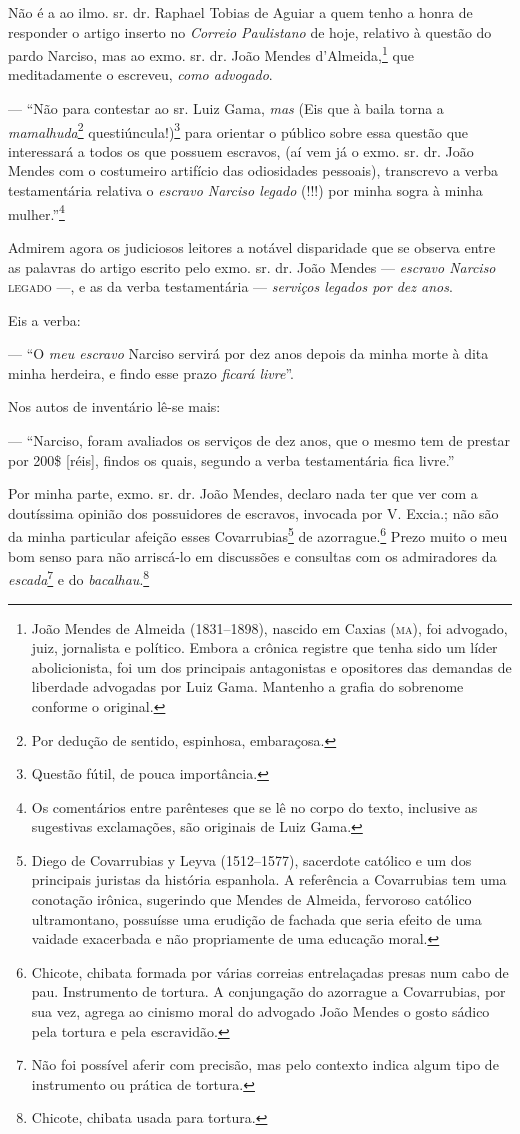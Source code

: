 Não é a ao ilmo. sr. dr. Raphael Tobias de Aguiar a quem tenho a honra
de responder o artigo inserto no \emph{Correio Paulistano} de hoje,
relativo à questão do pardo Narciso, mas ao exmo. sr. dr. João Mendes
d'Almeida,\footnote{ João Mendes de Almeida (1831--1898), nascido em
  Caxias (\textsc{ma}), foi advogado, juiz, jornalista e político. Embora a
  crônica registre que tenha sido um líder abolicionista, foi um dos
  principais antagonistas e opositores das demandas de liberdade
  advogadas por Luiz Gama. Mantenho a grafia do sobrenome conforme o
  original.} que meditadamente o escreveu, \emph{como advogado}.

--- ``Não para contestar ao sr. Luiz Gama, \emph{mas} (Eis que à baila
torna a \emph{mamalhuda}\footnote{ Por dedução de sentido,
  espinhosa, embaraçosa.} questiúncula!)\footnote{ Questão fútil, de
  pouca importância.} para orientar o público sobre essa questão que
interessará a todos os que possuem escravos, (aí vem já o exmo. sr. dr.
João Mendes com o costumeiro artifício das odiosidades pessoais),
transcrevo a verba testamentária relativa o \emph{escravo Narciso
legado} (!!!) por minha sogra à minha mulher.''\footnote{ Os
  comentários entre parênteses que se lê no corpo do texto, inclusive as
  sugestivas exclamações, são originais de Luiz Gama.}

Admirem agora os judiciosos leitores a notável disparidade que se
observa entre as palavras do artigo escrito pelo exmo. sr. dr. João
Mendes --- \emph{escravo Narciso} \textsc{legado} ---, e as da verba
testamentária --- \emph{serviços legados por dez anos}.

Eis a verba:

--- ``O \emph{meu escravo} Narciso servirá por dez anos depois da minha
morte à dita minha herdeira, e findo esse prazo \emph{ficará livre}''.

Nos autos de inventário lê-se mais:

--- ``Narciso, foram avaliados os serviços de dez anos, que o mesmo tem
de prestar por 200\$ {[}réis{]}, findos os quais, segundo a verba
testamentária fica livre.''

Por minha parte, exmo. sr. dr. João Mendes, declaro nada ter que ver com
a doutíssima opinião dos possuidores de escravos, invocada por V.
Excia.; não são da minha particular afeição esses Covarrubias\footnote{
  Diego de Covarrubias y Leyva (1512--1577), sacerdote católico e um dos
  principais juristas da história espanhola. A referência a Covarrubias
  tem uma conotação irônica, sugerindo que Mendes de Almeida, fervoroso
  católico ultramontano, possuísse uma erudição de fachada que seria
  efeito de uma vaidade exacerbada e não propriamente de uma educação
  moral.} de azorrague.\footnote{ Chicote,
  chibata formada por várias correias entrelaçadas presas num cabo de
  pau. Instrumento de tortura. A conjungação do azorrague a Covarrubias,
  por sua vez, agrega ao cinismo moral do advogado João Mendes o gosto
  sádico pela tortura e pela escravidão.} Prezo muito o meu bom senso
para não arriscá-lo em discussões e consultas com os admiradores da
\emph{escada}\footnote{ Não foi possível aferir com precisão, mas
  pelo contexto indica algum tipo de instrumento ou prática de tortura.}
e do \emph{bacalhau}.\footnote{ Chicote, chibata usada para tortura.}

